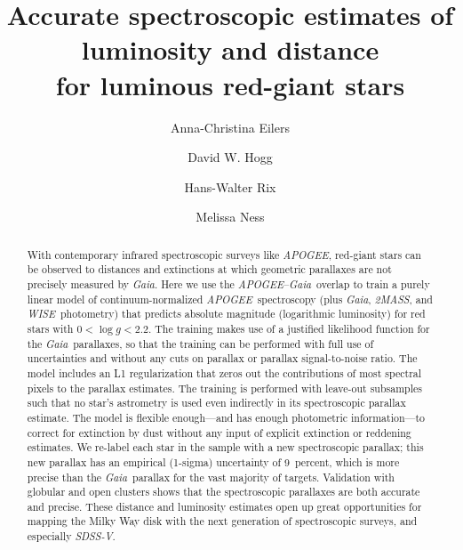 \documentclass[modern]{aastex62}
\newcommand{\acronym}[1]{{\small{#1}}}
\newcommand{\project}[1]{\textsl{#1}}
\newcommand{\apogee}{\project{\acronym{APOGEE}}}
\newcommand{\gaia}{\project{Gaia}}
\newcommand{\wise}{\project{\acronym{WISE}}}
\newcommand{\zmass}{\project{\acronym{2MASS}}}
\newcommand{\sdssv}{\project{\acronym{SDSS-V}}}
\newcommand{\logg}{\log g}
\begin{document}
\sloppy\sloppypar\raggedbottom\frenchspacing %

\title{\textbf{%
Accurate spectroscopic estimates of luminosity and distance\\
for luminous red-giant stars%
}}

\author[0000-0003-2895-6218]{Anna-Christina Eilers}

\author[0000-0003-2866-9403]{David W. Hogg}

\author{Hans-Walter Rix}

\author{Melissa Ness}

\begin{abstract}\noindent
With contemporary infrared spectroscopic surveys like \apogee,
red-giant stars can be observed to distances and extinctions
at which geometric parallaxes are not precisely measured by \gaia.
Here we use the \apogee--\gaia\ overlap to train a purely linear model of
continuum-normalized \apogee\ spectroscopy
(plus \gaia, \zmass, and \wise\ photometry)
that predicts absolute magnitude (logarithmic luminosity) for red stars with $0<\logg<2.2$.
The training makes use of a justified likelihood function for the \gaia\ parallaxes,
so that the training can be performed with full use of uncertainties and
without any cuts on parallax or parallax signal-to-noise ratio.
The model includes an L1 regularization that zeros out the contributions of
most spectral pixels to the parallax estimates.
The training is performed
with leave-out subsamples such that no star's astrometry is used even indirectly in its
spectroscopic parallax estimate.
The model is flexible enough---and has enough photometric information---to
correct for extinction by dust without any
input of explicit extinction or reddening estimates.
We re-label each star in the sample
with a new spectroscopic parallax; this new parallax has an empirical (1-sigma)
uncertainty of 9~percent, which is more precise than the \gaia\ parallax
for the vast majority of targets.
Validation with globular and open clusters shows that the spectroscopic parallaxes
are both accurate and precise.
These distance and luminosity estimates open up great opportunities for
mapping the Milky Way disk with the next
generation of spectroscopic surveys, and especially \sdssv.
\end{abstract}
\end{document}

